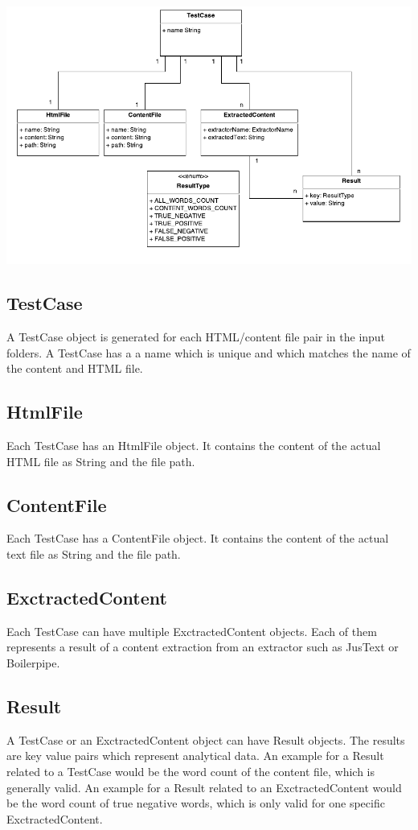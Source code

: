 \includegraphics[width=14cm]{Figures/dataModel.pdf}


\subsection{TestCase}
A TestCase object is generated for each HTML/content file pair in the input folders. A TestCase has a a name which is unique and which matches the name of the content and HTML file.

\subsection{HtmlFile}
Each TestCase has an HtmlFile object. It contains the content of the actual HTML file as String and the file path.

\subsection{ContentFile}
Each TestCase has a ContentFile object. It contains the content of the actual text file as String and the file path.

\subsection{ExctractedContent}
Each TestCase can have multiple ExctractedContent objects. Each of them represents a result of a content extraction from an extractor such as JusText or Boilerpipe.

\subsection{Result}
A TestCase or an ExctractedContent object can have Result objects. The results are key value pairs which represent analytical data. An example for a Result related to a TestCase would be the word count of the content file, which is generally valid. An example for a Result related to an ExctractedContent would be the word count of true negative words, which is only valid for one specific ExctractedContent.



